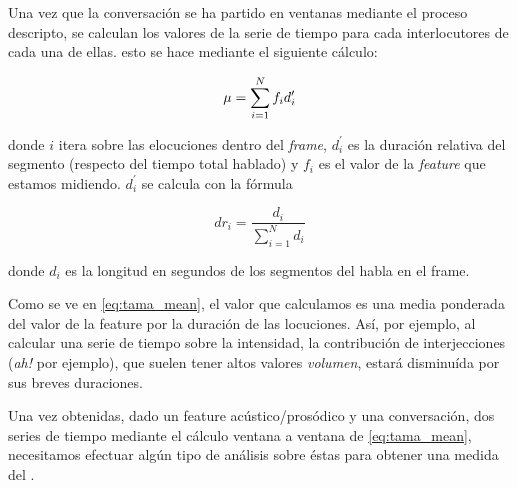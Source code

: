 Una vez que la conversación se ha partido en ventanas mediante el proceso descripto, se calculan los valores de la serie de tiempo para cada interlocutores de cada una de ellas. esto se hace mediante el siguiente cálculo:

\begin{equation}
    \mu = \sum\limits_{i=1}^N f_i d_i^\prime \label{eq:tama_mean}\\
\end{equation}

donde $i$ itera sobre las elocuciones dentro del \emph{frame}, $d_i^\prime$ es la duración relativa del segmento (respecto del tiempo total hablado) y $f_i$ es el valor de la \emph{feature} que estamos midiendo. $d_i^\prime$ se calcula con la fórmula

\begin{equation}
dr_i = \frac{d_i}{\sum\limits_{i=1}^N d_i}
\end{equation}

donde $d_i$ es la longitud en segundos de los segmentos del habla en el frame.

Como se ve en \ref{eq:tama_mean}, el valor que calculamos es una media ponderada del valor de la feature por la duración de las locuciones. Así, por ejemplo, al calcular una serie de tiempo sobre la intensidad, la contribución de interjecciones (\emph{ah!} por ejemplo), que suelen tener altos valores \emph{volumen}, estará disminuída por sus breves duraciones.

Una vez obtenidas, dado un feature acústico/prosódico y una conversación, dos series de tiempo mediante el cálculo ventana a ventana de \ref{eq:tama_mean}, necesitamos efectuar algún tipo de análisis sobre éstas para obtener una medida del \entrainment.

